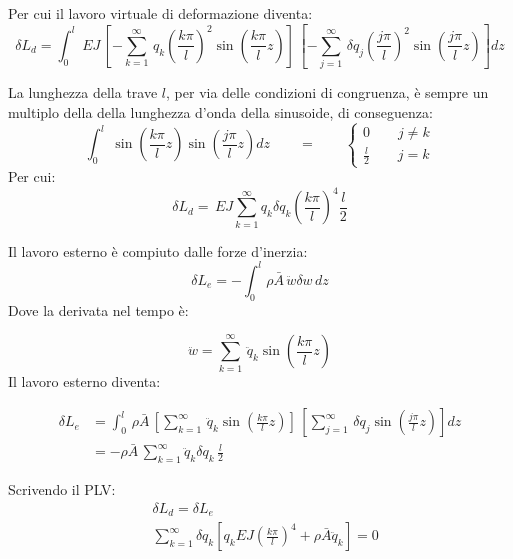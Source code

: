 Per cui il lavoro virtuale di deformazione diventa:
\begin{equation*}
    \delta L_d=\int_0^l \,EJ \,\left[ - \sum^\infty_{k=1}\,q_k   \left(\frac{k\pi}{l}\right)^2  \sin{\left(\frac{k\pi}{l}z\right)}    \right]\, 
    \left[  - \sum^\infty_{j=1}\,\delta q_j   \left(\frac{j\pi}{l}\right)^2  \sin{\left(\frac{j\pi}{l}z\right)}  \right]dz
\end{equation*}


La lunghezza della trave $l$, per via delle condizioni di congruenza,  è sempre un multiplo della  della lunghezza d'onda della sinusoide, di conseguenza:
\begin{equation*}
\int_0^l \,\sin{\left(\frac{k\pi}{l}z\right)} \sin{\left(\frac{j\pi}{l}z\right)}dz \qquad=\qquad
\begin{cases}
    0\qquad j\neq k\\
    \frac{l}{2} \qquad j=k
\end{cases}
\end{equation*}
Per cui:
\begin{equation*}
       \delta L_d= \,EJ\sum^\infty_{k=1} q_k \delta q_k  \left(\frac{k\pi}{l}\right)^4 \frac{l}{2}
\end{equation*}

Il lavoro esterno è compiuto dalle forze d'inerzia:
\begin{equation*}
    \delta L_e=-\int_0^l \rho \bar{A}\,\ddot{w} \delta w\,dz
\end{equation*}
Dove la derivata nel tempo è:

\begin{equation*}
    \ddot{w}= \sum^\infty_{k=1}\,\ddot{q}_k\sin{\left(\frac{k\pi}{l}z\right)}
\end{equation*}
Il lavoro esterno diventa:

\begin{align*}
    \delta L_e&=\int_0^l \,\rho\bar{A} \,\left[ \sum^\infty_{k=1}\,\ddot{q}_k\sin{\left(\frac{k\pi}{l}z\right)}   \right]\, 
    \left[   \sum^\infty_{j=1}\,\delta q_j   \sin{\left(\frac{j\pi}{l}z\right)}  \right]dz\\
    &=-\rho\bar{A} \,\sum^\infty_{k=1} \ddot{q}_k \delta q_k\,\frac{l}{2}
\end{align*}

Scrivendo il PLV:
\begin{align*}
  &  \delta L_d=\delta L_e\\
   & \sum^\infty_{k=1}  \delta q_k  \left[q_k EJ        \left(\frac{k\pi}{l}\right)^4    +\rho \bar{A}\ddot{q}_k\right]=0
\end{align*}

